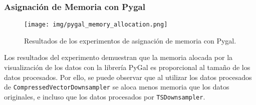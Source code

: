 \subsubsection{Asignación de Memoria con Pygal}
\label{exp:pygal-mem}

\begin{figure}[H]
    \centering
    \texttt{[image: img/pygal\_memory\_allocation.png]}
    \caption{Resultados de los experimentos de asignación de memoria con Pygal.}
    \label{fig:pygal-memory-allocation}
\end{figure}

Los resultados del experimento demuestran que la memoria alocada por la visualización de los datos con la librería PyGal es proporcional al tamaño de los datos procesados. Por ello, se puede observar que al utilizar los datos procesados de \texttt{CompressedVectorDownsampler} se aloca menos memoria que los datos originales, e incluso que los datos procesados por \texttt{TSDownsampler}.
